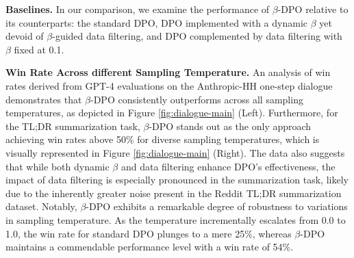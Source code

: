 \textbf{Baselines.} In our comparison, we examine the performance of $\beta$-DPO relative to its counterparts: the standard DPO, DPO implemented with a dynamic $\beta$ yet devoid of $\beta$-guided data filtering, and DPO complemented by data filtering with $\beta$ fixed at 0.1.

\textbf{Win Rate Across different Sampling Temperature.} An analysis of win rates derived from GPT-4 evaluations on the Anthropic-HH one-step dialogue demonstrates that $\beta$-DPO consistently outperforms across all sampling temperatures, as depicted in Figure \ref{fig:dialogue-main} (Left). Furthermore, for the TL;DR summarization task, $\beta$-DPO stands out as the only approach achieving win rates above 50\% for diverse sampling temperatures, which is visually represented in Figure \ref{fig:dialogue-main} (Right). The data also suggests that while both dynamic $\beta$ and data filtering enhance DPO's effectiveness, the impact of data filtering is especially pronounced in the summarization task, likely due to the inherently greater noise present in the Reddit TL;DR summarization dataset. Notably, $\beta$-DPO exhibits a remarkable degree of robustness to variations in sampling temperature. As the temperature incrementally escalates from 0.0 to 1.0, the win rate for standard DPO plunges to a mere 25\%, whereas $\beta$-DPO maintains a commendable performance level with a win rate of 54\%.


